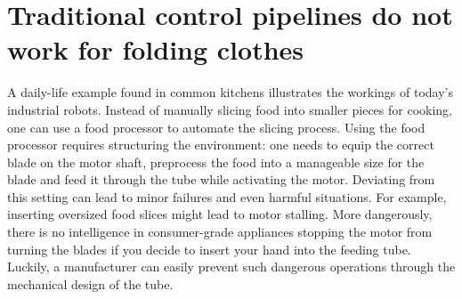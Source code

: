 \documentclass[\home/main.tex]{subfiles}
\begin{document}
\section{Traditional control pipelines do not work for folding clothes}
A daily-life example found in common kitchens illustrates the workings of today's industrial robots. Instead of manually slicing food into smaller pieces for cooking, one can use a food processor to automate the slicing process.
Using the food processor requires structuring the environment: one needs to equip the correct blade on the motor shaft, preprocess the food into a manageable size for the blade and feed it through the tube while activating the motor. Deviating from this setting can lead to minor failures and even harmful situations. For example, inserting oversized food slices might lead to motor stalling. More dangerously, there is no intelligence in consumer-grade appliances stopping the motor from turning the blades if you decide to insert your hand into the feeding tube. Luckily, a manufacturer can easily prevent such dangerous operations through the mechanical design of the tube.
\end{document}
